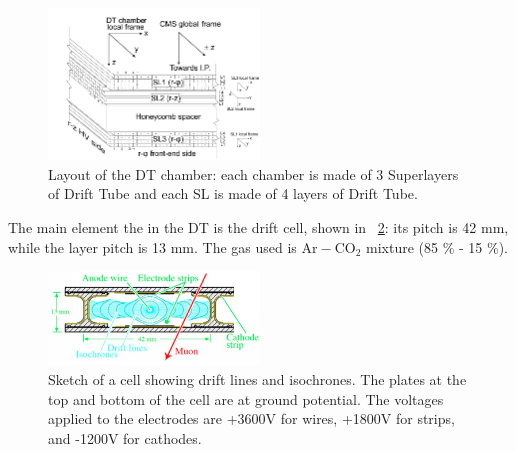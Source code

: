 \begin{figure}[h!]
 \centering
 \includegraphics[width=0.5\textwidth]{Images/DTchamber.png}
 \caption{Layout of the DT chamber: each chamber is made of 3 Superlayers of Drift Tube and each SL is made of 4 layers of Drift Tube.}
\label{DT_chamber}
\end{figure}
The main element the in the DT is the drift cell, shown in \figurename~\ref{DT_cell}: its pitch is 42 mm, while the layer pitch is 13 mm. The gas used is $\mathrm{Ar-CO_{2}}$ mixture (85 $\%$ - 15 $\%$).
\begin{figure}[h!]
 \centering
 \includegraphics[width=0.5\textwidth]{Images/DT_cell}
 \caption{Sketch of a cell showing drift lines and isochrones. The plates at the top and bottom of the cell are at ground potential. The voltages applied to the electrodes are +3600V for wires, +1800V for strips, and -1200V for cathodes.}
\label{DT_cell}
\end{figure}

